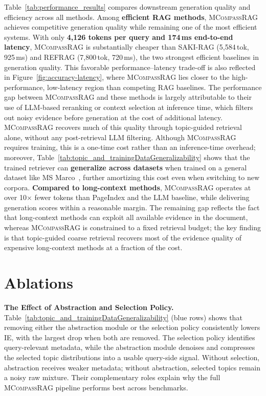\documentclass{llmxive}
\providecommand{\name}[1]{\textsc{MCompassRAG}\xspace}
\begin{document}
Table~\ref{tab:performance_results} compares downstream generation quality and efficiency across all methods. Among \textbf{efficient RAG methods}, \name{} achieves competitive generation quality while remaining one of the most efficient systems. With only \textbf{4,126 tokens per query and 174\,ms end-to-end latency}, \name{} is substantially cheaper than SAKI-RAG (5,584\,tok, 925\,ms) and REFRAG (7,800\,tok, 720\,ms), the two strongest efficient baselines in generation quality. This favorable performance--latency trade-off is also reflected in Figure~\ref{fig:accuracy-latency}, where \name{} lies closer to the high-performance, low-latency region than competing RAG baselines. The performance gap between \name{} and these methods is largely attributable to their use of LLM-based reranking or context selection at inference time, which filters out noisy evidence before generation at the cost of additional latency. \name{} recovers much of this quality through topic-guided retrieval alone, without any post-retrieval LLM filtering. Although \name{} requires training, this is a one-time cost rather than an inference-time overhead; moreover, Table~\ref{tab:topic_and_trainingDataGeneralizability} shows that the trained retriever can \textbf{generalize across datasets} when trained on a general dataset like MS Marco~\cite{DBLP:journals/corr/NguyenRSGTMD16}, further amortizing this cost even when switching to new corpora. \textbf{Compared to long-context methods}, \name{} operates at over 10$\times$ fewer tokens than PageIndex and the LLM baseline, while delivering generation scores within a reasonable margin. The remaining gap reflects the fact that long-context methods can exploit all available evidence in the document, whereas \name{} is constrained to a fixed retrieval budget; the key finding is that topic-guided coarse retrieval recovers most of the evidence quality of expensive long-context methods at a fraction of the cost.
\section{Ablations}
\label{sec:ablations}

\noindent
\textbf{The Effect of Abstraction and Selection Policy. }
Table~\ref{tab:topic_and_trainingDataGeneralizability} (\colorbox{cyan!15}{blue rows}) shows that removing either the abstraction module or the selection policy consistently lowers IE, with the largest drop when both are removed. The selection policy identifies query-relevant metadata, while the abstraction module denoises and compresses the selected topic distributions into a usable query-side signal. Without selection, abstraction receives weaker metadata; without abstraction, selected topics remain a noisy raw mixture. Their complementary roles explain why the full \name{} pipeline performs best across benchmarks.
\end{document}
